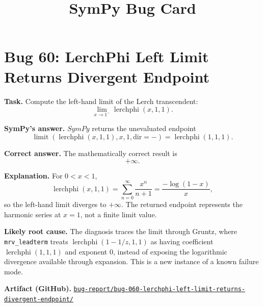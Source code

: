 \documentclass[11pt]{article}
\title{SymPy Bug Card}
\author{}
\date{}
\newcommand{\SymPy}{SymPy}
\newcommand{\artifactrepo}{https://github.com/TODO-org/TODO-repo}
\newcommand{\bugbundle}[1]{\href{\artifactrepo/tree/main/bug-report/#1}{\nolinkurl{bug-report/#1/}}}
\begin{document}
\maketitle

\section*{Bug 60: LerchPhi Left Limit Returns Divergent Endpoint}

\begin{counterexamplebox}
\textbf{Task.} Compute the left-hand limit of the Lerch transcendent:
\[
\lim_{x\to 1^-}\operatorname{lerchphi}(x,1,1).
\]

\medskip
\textbf{SymPy's answer.} \(\SymPy\) returns the unevaluated endpoint
\[
\operatorname{limit}(\operatorname{lerchphi}(x,1,1),x,1,\mathrm{dir}=-)
=\operatorname{lerchphi}(1,1,1).
\]

\medskip
\textbf{Correct answer.} The mathematically correct result is
\[
+\infty.
\]

\medskip
\textbf{Explanation.} For \(0<x<1\),
\[
\operatorname{lerchphi}(x,1,1)=\sum_{n=0}^{\infty}\frac{x^n}{n+1}
=\frac{-\log(1-x)}{x},
\]
so the left-hand limit diverges to \(+\infty\). The returned endpoint represents the harmonic series at \(x=1\), not a finite limit value.

\medskip
\textbf{Likely root cause.} The diagnosis traces the limit through Gruntz, where \texttt{mrv\_leadterm} treats \(\operatorname{lerchphi}(1-1/z,1,1)\) as having coefficient \(\operatorname{lerchphi}(1,1,1)\) and exponent \(0\), instead of exposing the logarithmic divergence available through expansion. This is a new instance of a known failure mode.

\medskip
\textbf{Artifact (GitHub).} \bugbundle{bug-060-lerchphi-left-limit-returns-divergent-endpoint}
\end{counterexamplebox}
\end{document}
